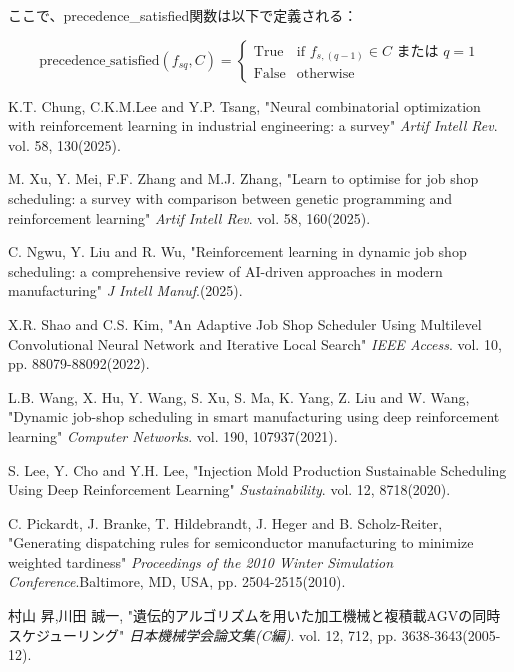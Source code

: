 \documentclass{jarticle}
\begin{document}
ここで、precedence\_satisfied関数は以下で定義される：

\[
\text{precedence\_satisfied}(f_{sq}, C) =
\begin{cases}
    \text{True} & \text{if } f_{s,(q-1)} \in C \text{ または } q = 1 \\
    \text{False} & \text{otherwise}
\end{cases}
\]
    
\begin{thebibliography}{99}

 K.T. Chung, C.K.M.Lee and Y.P. Tsang, "Neural combinatorial optimization with reinforcement learning in industrial engineering: a survey"
\textit{Artif Intell Rev}. vol. 58, 130(2025).

 M. Xu, Y. Mei, F.F. Zhang and M.J. Zhang, "Learn to optimise for job shop scheduling: a survey with comparison between genetic programming and reinforcement learning"
\textit{Artif Intell Rev}. vol. 58, 160(2025).

 C. Ngwu, Y. Liu and R. Wu, "Reinforcement learning in dynamic job shop scheduling: a comprehensive review of AI-driven approaches in modern manufacturing"
\textit{J Intell Manuf}.(2025).

 X.R. Shao and C.S. Kim, "An Adaptive Job Shop Scheduler Using Multilevel Convolutional Neural Network and Iterative Local Search"
\textit{IEEE Access}. vol. 10, pp. 88079-88092(2022).

 L.B. Wang, X. Hu, Y. Wang, S. Xu, S. Ma, K. Yang, Z. Liu and W. Wang, "Dynamic job-shop scheduling in smart manufacturing using deep reinforcement learning"
\textit{Computer Networks}. vol. 190, 107937(2021).

 S. Lee, Y. Cho and Y.H. Lee, "Injection Mold Production Sustainable Scheduling Using Deep Reinforcement Learning"
\textit{Sustainability}. vol. 12, 8718(2020).

 C. Pickardt, J. Branke, T. Hildebrandt, J. Heger and B. Scholz-Reiter, "Generating dispatching rules for semiconductor manufacturing to minimize weighted tardiness"
\textit{Proceedings of the 2010 Winter Simulation Conference}.Baltimore, MD, USA, pp. 2504-2515(2010).

 村山 昇,川田 誠一, "遺伝的アルゴリズムを用いた加工機械と複積載AGVの同時スケジューリング"
\textit{日本機械学会論文集(C編)}. vol. 12, 712, pp. 3638-3643(2005-12).


\end{thebibliography}
\end{document}
